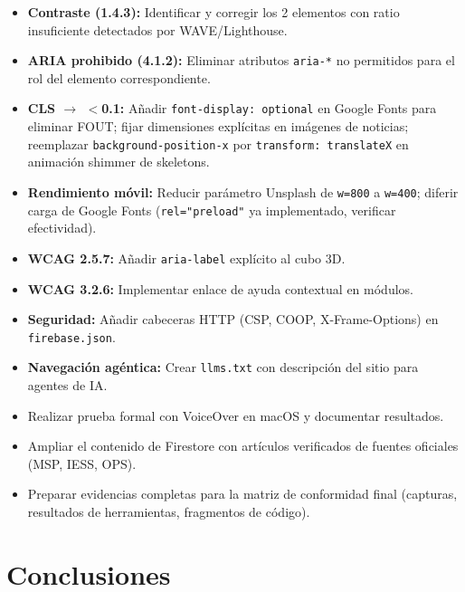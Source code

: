 \documentclass[12pt, a4paper]{article}
\begin{document}
\begin{itemize}
  \item \textbf{Contraste (1.4.3):} Identificar y corregir los 2 elementos con ratio insuficiente detectados por WAVE/Lighthouse.
  \item \textbf{ARIA prohibido (4.1.2):} Eliminar atributos \texttt{aria-*} no permitidos para el rol del elemento correspondiente.
  \item \textbf{CLS $\to$ $<$0.1:} Añadir \texttt{font-display: optional} en Google Fonts para eliminar FOUT; fijar dimensiones explícitas en imágenes de noticias; reemplazar \texttt{background-position-x} por \texttt{transform: translateX} en animación shimmer de skeletons.
  \item \textbf{Rendimiento móvil:} Reducir parámetro Unsplash de \texttt{w=800} a \texttt{w=400}; diferir carga de Google Fonts (\texttt{rel="preload"} ya implementado, verificar efectividad).
  \item \textbf{WCAG 2.5.7:} Añadir \texttt{aria-label} explícito al cubo 3D.
  \item \textbf{WCAG 3.2.6:} Implementar enlace de ayuda contextual en módulos.
  \item \textbf{Seguridad:} Añadir cabeceras HTTP (CSP, COOP, X-Frame-Options) en \texttt{firebase.json}.
  \item \textbf{Navegación agéntica:} Crear \texttt{llms.txt} con descripción del sitio para agentes de IA.
  \item Realizar prueba formal con VoiceOver en macOS y documentar resultados.
  \item Ampliar el contenido de Firestore con artículos verificados de fuentes oficiales (MSP, IESS, OPS).
  \item Preparar evidencias completas para la matriz de conformidad final (capturas, resultados de herramientas, fragmentos de código).
\end{itemize}

\section{Conclusiones}
\end{document}
